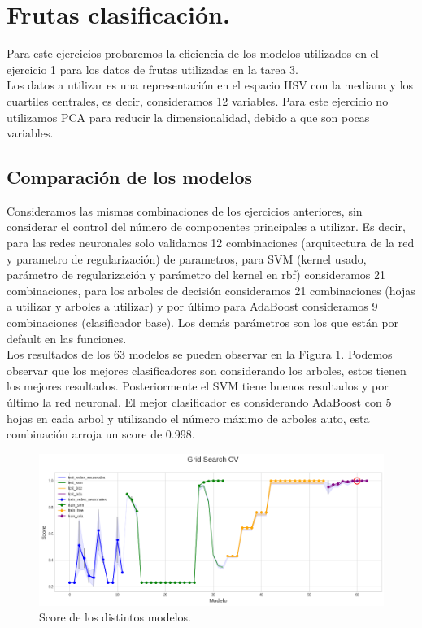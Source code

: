\documentclass[paper=letter, fontsize=11pt]{scrartcl}
\numberwithin{equation}{section} %
\numberwithin{figure}{section} %
\numberwithin{table}{section} %
\begin{document}
\section{Frutas clasificación.}
Para este ejercicios probaremos la eficiencia de los modelos utilizados en el ejercicio 1 para los datos de frutas utilizadas en la tarea 3. \\

Los datos a utilizar es una representación en el espacio HSV con la mediana y los cuartiles centrales, es decir, consideramos 12 variables. Para este ejercicio no utilizamos PCA para reducir la dimensionalidad, debido a que son pocas variables.

\subsection*{Comparación de los modelos}
Consideramos las mismas combinaciones de los ejercicios anteriores, sin considerar el control del número de componentes principales a utilizar. Es decir, para las redes neuronales solo validamos 12 combinaciones (arquitectura de la red y parametro de regularización) de parametros, para SVM (kernel usado, parámetro de regularización y parámetro del kernel en rbf) consideramos 21 combinaciones, para los arboles de decisión consideramos 21 combinaciones (hojas a utilizar y arboles a utilizar) y por último para AdaBoost consideramos 9 combinaciones (clasificador base). Los demás parámetros son los que están por default en las funciones.\\

Los resultados de los 63 modelos se pueden observar en la Figura \ref{futras}. Podemos observar que los mejores clasificadores son considerando los arboles, estos tienen los mejores resultados. Posteriormente el SVM tiene buenos resultados y por último la red neuronal. El mejor clasificador es considerando AdaBoost con 5 hojas en cada arbol y utilizando el número máximo de arboles auto, esta combinación arroja un score de 0.998.

\begin{figure}[H]
\centering
\includegraphics[scale=0.55]{figure/frutas.png}
\caption{Score de los distintos modelos.} \label{futras}
\end{figure}
\end{document}
